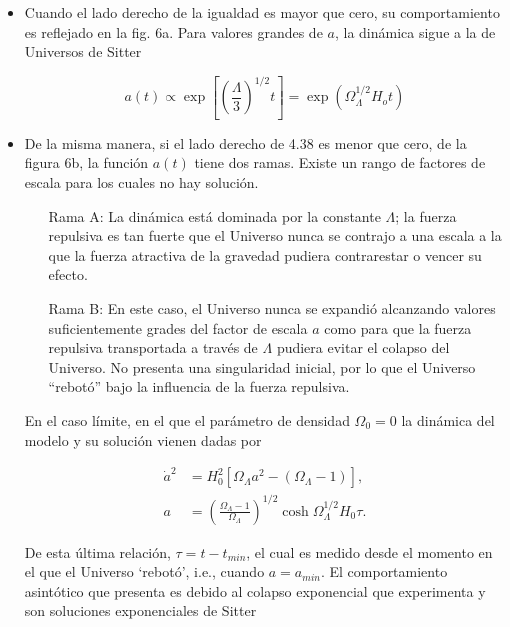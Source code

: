 \documentclass[11pt]{article}
\begin{document}
     \begin{itemize}
         \item Cuando el lado derecho de la igualdad es mayor que cero, su comportamiento es reflejado en la fig. 6a. Para valores grandes de $a$, la dinámica sigue  a la  de Universos de Sitter
         
        \begin{equation}
        a(t) \propto \exp \left[\left(\frac{\Lambda}{3} \right)^{1/2} t \right] = \exp (\Omega^{1/2}_{\Lambda} H_ot)
        \end{equation}
    
        \item De la misma manera, si el lado derecho de 4.38 es menor que cero, de la figura 6b, la función $a(t)$ tiene dos ramas. Existe un rango de factores de escala para los cuales no hay solución.
        
            \begin{itemize}
                \item [Rama A:] La dinámica está dominada por la constante $\Lambda$; la fuerza repulsiva es tan fuerte que el Universo nunca se contrajo a una escala a la que la fuerza atractiva de la gravedad pudiera contrarestar o vencer su efecto. 
        
                \item [Rama B:] En este caso, el Universo nunca se expandió alcanzando valores suficientemente grades del factor de escala $a$ como para que la fuerza repulsiva transportada a través de $\Lambda$ pudiera evitar el colapso del Universo. No presenta una singularidad inicial, por lo que el Universo ``rebotó''  bajo la influencia de la fuerza repulsiva. 
            \end{itemize}
            
            En el caso límite, en el que el parámetro de densidad $\Omega_0 = 0$ la dinámica del modelo y su solución vienen dadas por
            
            \begin{align}
                \dot{a}^2 & = H_0^2 [\Omega_{\Lambda} a^2 - (\Omega_{\Lambda}-1)], \\
                a & = \left(\frac{\Omega_{\Lambda} - 1}{\Omega_{\Lambda}} \right)^{1/2} \cosh \Omega_{\Lambda}^{1/2} H_0 \tau.
            \end{align}
            
            De esta última relación, $\tau = t - t_{min}$, el cual es medido desde el momento en el que el Universo `rebotó', i.e., cuando $a= a_{min}$. El comportamiento asintótico que presenta es debido al colapso exponencial que experimenta y son soluciones exponenciales de Sitter
            

\end{itemize}
\end{document}

